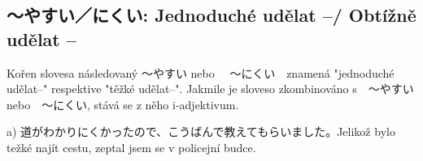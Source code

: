 \subsection{〜やすい／にくい: Jednoduché udělat --/ Obtížně udělat --}
Kořen slovesa následovaný 〜やすい nebo 　〜にくい　znamená "jednoduché udělat--" respektive "těžké udělat--". Jakmile je sloveso zkombinováno s　〜やすい nebo　〜にくい, stává se z něho i-adjektivum.

a) 道がわかりにくかったので、こうばんで教えてもらいました。Jelikož bylo težké najít cestu, zeptal jsem se v policejní budce.















